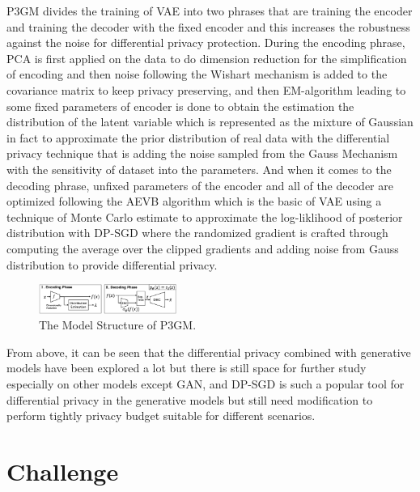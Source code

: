 \documentclass[conference]{IEEEtran}
\begin{document}
P3GM\cite{b49} divides the training of VAE into two phrases that are training the encoder and training the decoder with the fixed encoder and this increases the robustness against the noise for differential privacy protection. During the encoding phrase, PCA is first applied on the data to do dimension reduction for the simplification of encoding and then  noise following the Wishart mechanism is added to the covariance matrix to keep privacy preserving, and then EM-algorithm leading to some fixed parameters of encoder is done to obtain the estimation the distribution of the latent variable which is represented as the mixture of Gaussian in fact to approximate the prior distribution of real data with the differential privacy technique that is adding the noise sampled from the Gauss Mechanism with the sensitivity of dataset into the parameters. And when it comes to the decoding phrase, unfixed parameters of the encoder and all of the decoder are optimized following the AEVB algorithm which is the basic of VAE using a technique of Monte Carlo estimate to approximate the log-liklihood of posterior distribution with DP-SGD where the randomized gradient is crafted through computing the average over
the clipped gradients and adding noise from Gauss distribution to provide differential privacy.

\begin{figure}[htbp]
    \centerline{\includegraphics[width=0.4\textwidth,height=0.15\textwidth]{P3GM.png}}
    \caption{The Model Structure of P3GM.}
    \label{fig13}
\end{figure}





From above, it can be seen that the differential privacy combined with generative models have been explored a lot but there is still space for further study especially on other models except GAN, and DP-SGD is such a popular tool for differential privacy in the generative models but still need modification to perform tightly privacy budget suitable for different scenarios.


\section{Challenge}
\end{document}

